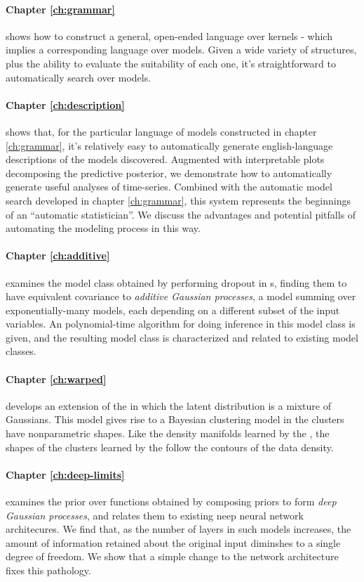 \paragraph{Chapter \ref{ch:grammar}} shows how to construct a general, open-ended language over kernels - which implies a corresponding language over models.
Given a wide variety of structures, plus the ability to evaluate the suitability of each one, it's straightforward to automatically search over models.

\paragraph{Chapter \ref{ch:description}} shows that, for the particular language of models constructed in chapter \ref{ch:grammar}, it's relatively easy to automatically generate english-language descriptions of the models discovered.
Augmented with interpretable plots decomposing the predictive posterior, we demonstrate how to automatically generate useful analyses of time-series.
Combined with the automatic model search developed in chapter \ref{ch:grammar}, this system represents the beginnings of an ``automatic statistician''.
We discuss the advantages and potential pitfalls of automating the modeling process in this way.

\paragraph{Chapter \ref{ch:additive}} examines the model class obtained by performing dropout in \gp{}s, finding them to have equivalent covariance to \emph{additive Gaussian processes}, a model summing over exponentially-many \gp{} models, each depending on a different subset of the input variables.  An polynomial-time algorithm for doing inference in this model class is given, and the resulting model class is characterized and related to existing model classes.

\paragraph{Chapter \ref{ch:warped}} develops an extension of the \gplvm{} in which the latent distribution is a mixture of Gaussians.  This model gives rise to a Bayesian clustering model in the clusters have nonparametric shapes.  Like the density manifolds learned by the \gplvm{}, the shapes of the clusters learned by the \iwmm{} follow the contours of the data density.

\paragraph{Chapter \ref{ch:deep-limits}} examines the prior over functions obtained by composing \gp{} priors to form \emph{deep Gaussian processes}, and relates them to existing neep neural network architecures.
We find that, as the number of layers in such models increases, the amount of information retained about the original input diminshes to a single degree of freedom.
We show that a simple change to the network architecture fixes this pathology.


